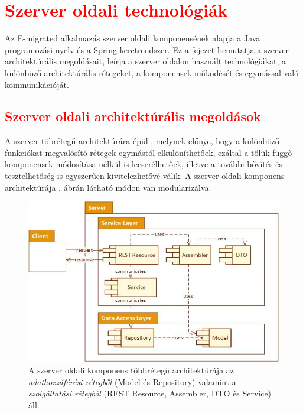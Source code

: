 \chapter{\textcolor{red}{Szerver oldali technológiák}}\label{ch:szerver}


	Az E-migrated alkalmazás szerver oldali komponensének alapja a Java programozási nyelv és a Spring keretrendszer. Ez a fejezet bemutatja a szerver architektúrális megoldásait, leírja a szerver oldalon használt technológiákat, a különböző architektúrális rétegeket, a komponensek működését és egymással való kommunikációját. 

\section{\textcolor{red}{Szerver oldali architektúrális megoldások}}
\label{sec:szerverArch}

A szerver töbrétegű architektúrára épül \cite{MultitierArchitecture}, melynek előnye, hogy a különböző funkciókat megvalósító rétegek egymástól elkülöníthetőek, ezáltal a tőlük függő komponensek módosítása nélkül is lecserélhetőek, illetve a további bővítés és tesztelhetőség is egyszerűen kivitelezhetővé válik. A szerver oldali komponens architektúrája . ábrán látható módon van modularizálva. 
\begin{figure}
  \centering
  \includegraphics[width=1\linewidth]{images/ServerArchitecture}
  \caption{A szerver oldali komponens többrétegű architektúrája  az \textsl{adathozzáférési rétegből} (Model és Repository) valamint a \textsl{szolgáltatási rétegből} (REST Resource, Assembler, DTO és Service) áll.}
  \label{fig:ServerArchitecture}
\end{figure}

